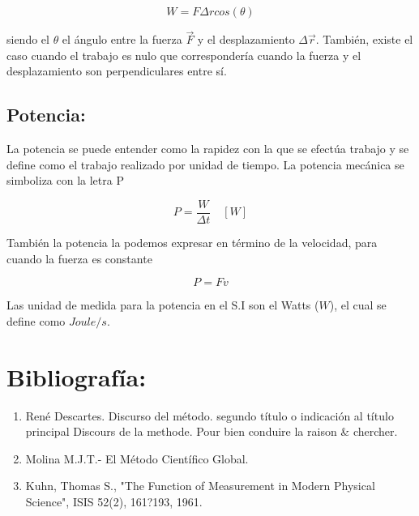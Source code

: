 \documentclass[a5paper,pagesize,10pt,bibtotoc,pointlessnumbers,
normalheadings,DIV=9,fleqn,x11names,table,twoside=false]{scrbook}
\begin{document}
\begin{equation}
W = F\Delta r cos(\theta)
\end{equation}
 
siendo el $\theta$ el ángulo entre la fuerza $\vec{F}$ y el desplazamiento $\Delta \vec{r}$. También, existe el caso cuando el 
trabajo es nulo que correspondería cuando la fuerza y el desplazamiento son perpendiculares entre sí.
  
\section{Potencia:}  

La potencia se puede entender como la rapidez con la que se efectúa trabajo y se define como el trabajo realizado por unidad de 
tiempo. La potencia mecánica se simboliza con la letra P

\begin{equation}
P = \frac{W}{\Delta t}\quad [W]
\end{equation}

También la potencia la podemos expresar en término de la velocidad, para cuando la fuerza es constante

\begin{equation}
P = Fv
\end{equation}

Las unidad de medida para la potencia en el S.I son el Watts ($W$), el cual se define como $Joule/s$.

\chapter*{Bibliografía:}

\begin{enumerate}
 \item René Descartes. Discurso del método. segundo título o indicación al título principal Discours de la methode. Pour bien 
conduire la raison \& chercher.
 \item Molina M.J.T.- El Método Científico Global.
 \item Kuhn, Thomas S., "The Function of Measurement in Modern Physical Science", ISIS 52(2), 161?193, 1961.
 \end{enumerate}
\end{document}
